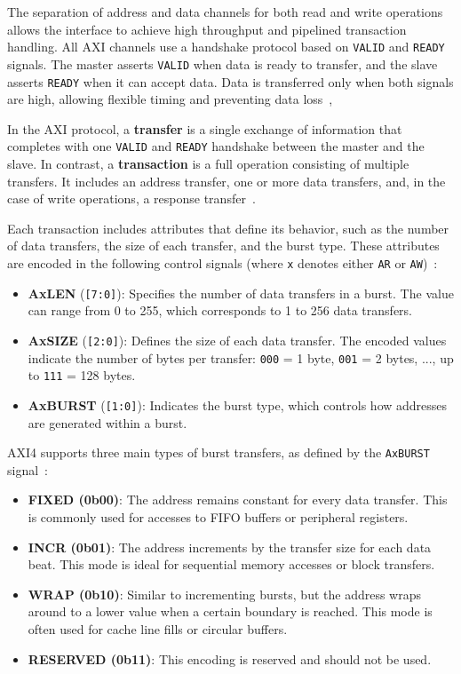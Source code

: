 The separation of address and data channels for both read and write operations allows the interface to achieve high throughput and pipelined transaction handling. 
All AXI channels use a handshake protocol based on \texttt{VALID} and \texttt{READY} signals. The master asserts \texttt{VALID} when data is ready to transfer, and the slave asserts \texttt{READY} when it can accept data. Data is transferred only when both signals are high, allowing flexible timing and preventing data loss~\cite{arm_ltd_introduction_2020},


In the AXI protocol, a \textbf{transfer} is a single exchange of information that completes with one \texttt{VALID} and \texttt{READY} handshake between the master and the slave. In contrast, a \textbf{transaction} is a full operation consisting of multiple transfers. It includes an address transfer, one or more data transfers, and, in the case of write operations, a response transfer~\cite{arm_ltd_introduction_2020}.

Each transaction includes attributes that define its behavior, such as the number of data transfers, the size of each transfer, and the burst type. These attributes are encoded in the following control signals (where \texttt{x} denotes either \texttt{AR} or \texttt{AW})~\cite{arm_ltd_introduction_2020}:

\begin{itemize}
    \item \textbf{AxLEN} (\texttt{[7:0]}): Specifies the number of data transfers in a burst. The value can range from 0 to 255, which corresponds to 1 to 256 data transfers.
    \item \textbf{AxSIZE} (\texttt{[2:0]}): Defines the size of each data transfer. The encoded values indicate the number of bytes per transfer: \texttt{000} = 1 byte, \texttt{001} = 2 bytes, ..., up to \texttt{111} = 128 bytes.
    \item \textbf{AxBURST} (\texttt{[1:0]}): Indicates the burst type, which controls how addresses are generated within a burst.
\end{itemize}


AXI4 supports three main types of burst transfers, as defined by the \texttt{AxBURST} signal~\cite{arm_ltd_introduction_2020}:

\begin{itemize}
    \item \textbf{FIXED (0b00)}: The address remains constant for every data transfer. This is commonly used for accesses to FIFO buffers or peripheral registers.
    \item \textbf{INCR (0b01)}: The address increments by the transfer size for each data beat. This mode is ideal for sequential memory accesses or block transfers.
    \item \textbf{WRAP (0b10)}: Similar to incrementing bursts, but the address wraps around to a lower value when a certain boundary is reached. This mode is often used for cache line fills or circular buffers.
    \item \textbf{RESERVED (0b11)}: This encoding is reserved and should not be used.
\end{itemize}


